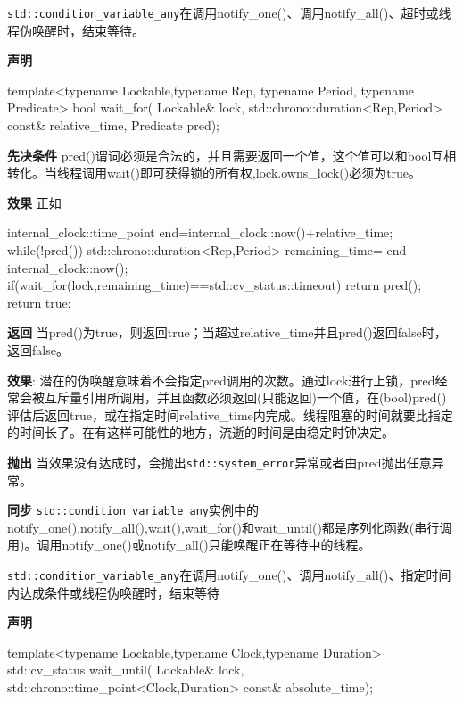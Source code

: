 
\texttt{std::condition\_variable\_any}在调用notify\_one()、调用notify\_all()、超时或线程伪唤醒时，结束等待。

\textbf{声明}

\begin{cpp}
template<typename Lockable,typename Rep,
    typename Period, typename Predicate>
bool wait_for(
    Lockable& lock,
    std::chrono::duration<Rep,Period> const& relative_time,
    Predicate pred);
  \end{cpp}

\textbf{先决条件}
pred()谓词必须是合法的，并且需要返回一个值，这个值可以和bool互相转化。当线程调用wait()即可获得锁的所有权,lock.owns\_lock()必须为true。

\textbf{效果}
正如

\begin{cpp}
internal_clock::time_point end=internal_clock::now()+relative_time;
while(!pred())
{
  std::chrono::duration<Rep,Period> remaining_time=
      end-internal_clock::now();
  if(wait_for(lock,remaining_time)==std::cv_status::timeout)
      return pred();
}
return true;
\end{cpp}

\textbf{返回}
当pred()为true，则返回true；当超过relative\_time并且pred()返回false时，返回false。

\textbf{效果}:
潜在的伪唤醒意味着不会指定pred调用的次数。通过lock进行上锁，pred经常会被互斥量引用所调用，并且函数必须返回(只能返回)一个值，在(bool)pred()评估后返回true，或在指定时间relative\_time内完成。线程阻塞的时间就要比指定的时间长了。在有这样可能性的地方，流逝的时间是由稳定时钟决定。

\textbf{抛出}
当效果没有达成时，会抛出\texttt{std::system\_error}异常或者由pred抛出任意异常。

\textbf{同步}
\texttt{std::condition\_variable\_any}实例中的notify\_one(),notify\_all(),wait(),wait\_for()和wait\_until()都是序列化函数(串行调用)。调用notify\_one()或notify\_all()只能唤醒正在等待中的线程。


\texttt{std::condition\_variable\_any}在调用notify\_one()、调用notify\_all()、指定时间内达成条件或线程伪唤醒时，结束等待

\textbf{声明}

\begin{cpp}
template<typename Lockable,typename Clock,typename Duration>
std::cv_status wait_until(
    Lockable& lock,
    std::chrono::time_point<Clock,Duration> const& absolute_time);
\end{cpp}

